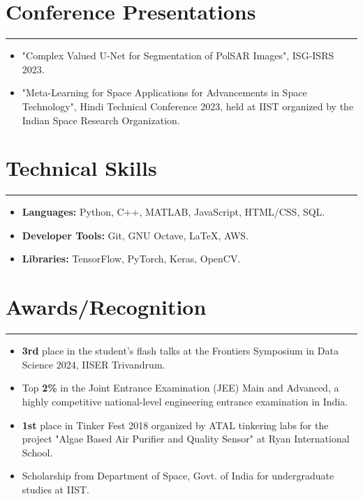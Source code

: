 \documentclass[11pt]{article}
\newlength{\sectionvspace}
\newlength{\sectionvspacee}
\begin{document}
\section*{\bf Conference Presentations}
\vspace{\sectionvspace}%
\rule{\textwidth}{0.4pt}
\begin{itemize}[leftmargin=*,noitemsep,topsep=0pt]
	\item "Complex Valued U-Net for Segmentation of PolSAR Images", ISG-ISRS 2023.
	\item "Meta-Learning for Space Applications for Advancements in Space Technology", Hindi Technical Conference 2023, held at IIST organized by the Indian Space Research Organization.
\end{itemize}

\vspace{\sectionvspacee}	
	
	\vspace{\sectionvspacee}
\section*{\bf Technical Skills}
\vspace{\sectionvspace}
\rule{\textwidth}{0.4pt}
\begin{itemize}[leftmargin=*,noitemsep,topsep=0pt]
	\item \textbf{Languages:} Python, C++, MATLAB, JavaScript, HTML/CSS, SQL.
	\item \textbf{Developer Tools:} Git, GNU Octave, LaTeX, AWS.
	\item \textbf{Libraries:} TensorFlow, PyTorch, Keras, OpenCV.
\end{itemize}


\vspace{\sectionvspacee}
\section*{\bf Awards/Recognition}
\vspace{\sectionvspace}
\rule{\textwidth}{0.4pt}
\begin{itemize}[leftmargin=*,noitemsep,topsep=0pt]
	\item \textbf{3rd} place in the student's flash talks at the Frontiers Symposium in Data Science 2024, IISER Trivandrum.
	\item Top \textbf{2\%} in the Joint Entrance Examination (JEE) Main and Advanced, a highly competitive national-level engineering entrance examination in India.
	\item \textbf{1st} place in Tinker Fest 2018 organized by ATAL tinkering labs for the project "Algae Based Air Purifier and Quality Sensor" at Ryan International School.
				\item Scholarship from Department of Space, Govt. of India for undergraduate studies at IIST.
\end{itemize}
\end{document}
